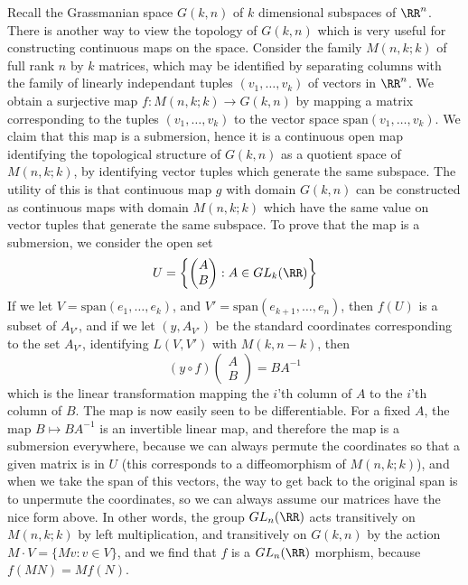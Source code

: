 \begin{example}
    Recall the Grassmanian space $G(k,n)$ of $k$ dimensional subspaces of $\RR^n$. There is another way to view the topology of $G(k,n)$ which is very useful for constructing continuous maps on the space. Consider the family $M(n,k;k)$ of full rank $n$ by $k$ matrices, which may be identified by separating columns with the family of linearly independant tuples $(v_1, \dots, v_k)$ of vectors in $\RR^n$. We obtain a surjective map $f: M(n,k;k) \to G(k,n)$ by mapping a matrix corresponding to the tuples $(v_1, \dots, v_k)$ to the vector space $\text{span}(v_1, \dots, v_k)$. We claim that this map is a submersion, hence it is a continuous open map identifying the topological structure of $G(k,n)$ as a quotient space of $M(n,k;k)$, by identifying vector tuples which generate the same subspace. The utility of this is that continuous map $g$ with domain $G(k,n)$ can be constructed as continuous maps with domain $M(n,k;k)$ which have the same value on vector tuples that generate the same subspace. To prove that the map is a submersion, we consider the open set
    \[ U = \left\{ \begin{pmatrix} A \\ B \end{pmatrix}: A \in GL_k(\RR) \right\} \]
    If we let $V = \text{span}(e_1, \dots, e_k)$, and $V' = \text{span}(e_{k+1}, \dots, e_n)$, then $f(U)$ is a subset of $A_{V'}$, and if we let $(y,A_{V'})$ be the standard coordinates corresponding to the set $A_{V'}$, identifying $L(V,V')$ with $M(k,n-k)$, then
    \[ (y \circ f) \begin{pmatrix} A \\ B \end{pmatrix} = BA^{-1} \]
    which is the linear transformation mapping the $i$'th column of $A$ to the $i$'th column of $B$. The map is now easily seen to be differentiable. For a fixed $A$, the map $B \mapsto BA^{-1}$ is an invertible linear map, and therefore the map is a submersion everywhere, because we can always permute the coordinates so that a given matrix is in $U$ (this corresponds to a diffeomorphism of $M(n,k;k)$), and when we take the span of this vectors, the way to get back to the original span is to unpermute the coordinates, so we can always assume our matrices have the nice form above. In other words, the group $GL_n(\RR)$ acts transitively on $M(n,k;k)$ by left multiplication, and transitively on $G(k,n)$ by the action $M \cdot V = \{ Mv : v \in V \}$, and we find that $f$ is a $GL_n(\RR)$ morphism, because $f(MN) = Mf(N)$.
\end{example}




